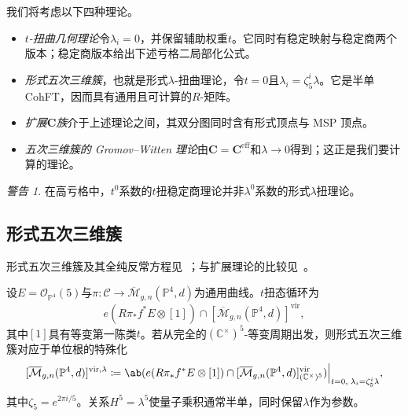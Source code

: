 \documentclass{amsart}
\theoremstyle{definition}
\theoremstyle{remark}
\newtheorem{warn}[thm]{警告}
\theoremstyle{plain}
\theoremstyle{definition}
\theoremstyle{remark}
\newcommand{\C}{\mathbb{C}}
\renewcommand{\P}{\mathbb{P}}
\newcommand{\Mbar}{\overline{\mathcal{M}}}
\newcommand{\mc}[1]{\mathcal{#1}}
\newcommand{\mbf}[1]{\mathbf{#1}}
\newcommand{\mr}[1]{\mathrm{#1}}
\newcommand{\1}{\mathbf{1}}
\newcommand{\2}{\mathbf{2}}
\newcommand{\3}{\mathbf{3}}
\newcommand{\vir}{\mr{vir}}
\begin{document}
我们将考虑以下四种理论。
\begin{itemize}
    \item \textit{\(t\)-扭曲几何理论}令\(\lambda_i = 0\)，并保留辅助权重\(t\)。它同时有稳定映射与稳定商两个版本；稳定商版本给出下述亏格二局部化公式。
    \item \textit{形式五次三维簇}，也就是形式\(\lambda\)-扭曲理论，令\(t = 0\)且\(\lambda_i = \zeta_5^i \lambda\)。它是半单 CohFT，因而具有通用且可计算的\(R\)-矩阵。
    \item \textit{扩展\(\mbf{C}\)族}介于上述理论之间，其双分图同时含有形式顶点与 MSP 顶点。
    \item \textit{五次三维簇的 Gromov--Witten 理论}由\(\mbf{C} = \mbf{C}^{\mr{eff}}\)和\(\lambda \to 0\)得到；这正是我们要计算的理论。
\end{itemize}

\begin{warn}
    在高亏格中，\(t^0\)系数的\(t\)扭稳定商理论并非\(\lambda^0\)系数的形式\(\lambda\)扭理论。
\end{warn}

\subsection{形式五次三维簇}%
\label{sub:The formal quintic}

形式五次三维簇及其全纯反常方程见~\cite{LhoPandharipande2019}；与扩展理论的比较见~\cite{GJRstructure}。

设\(E = \mc{O}_{\P^4}(5)\)与\(\pi \colon \mc{C} \to \Mbar_{g,n}(\P^4,d)\)为通用曲线。\(t\)扭态循环为
\[ e(R\pi_* f^* E \otimes [1]) \cap [\Mbar_{g,n}(\P^4,d)]^{\vir}, \]
其中\([1]\)具有等变第一陈类\(t\)。若从完全的\((\C^{\times})^5\)-等变周期出发，则形式五次三维簇对应于单位根的特殊化
\[ [\Mbar_{g,n}(\P^4,d)]^{\vir,\lambda} \coloneqq \ab( e(R\pi_*f^*E \otimes [1]) \cap [\Mbar_{g,n}(\P^4,d)]^{\vir}_{(\C^{\times})^5})\Big|_{t=0, \; \lambda_i = \zeta_5^i \lambda}, \]
其中\(\zeta_5 = e^{2\pi i/5}\)。关系\(H^5 = \lambda^5\)使量子乘积通常半单，同时保留\(\lambda\)作为参数。
\end{document}
